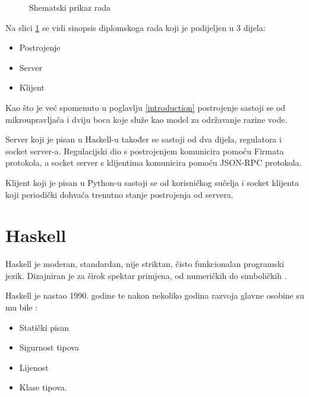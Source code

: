 \begin{figure}[H]
\caption{Shematski prikaz rada}
\label{fig:main_sheme}
\end{figure}

Na slici \ref{fig:main_sheme} se vidi sinopsis diplomskoga rada koji je podijeljen u 3 dijela:
\begin{itemize}
        \item Postrojenje
        \item Server
        \item Klijent
\end{itemize}

Kao što je već spomenuto u poglavlju \ref{introduction} postrojenje sastoji se
od mikroupravljača i dviju boca koje služe kao model za održavanje razine vode.

Server koji je pisan u Haskell-u također se sastoji od dva dijela, regulatora i
socket server-a. Regulacijski dio s postrojenjem komunicira pomoću Firmata
protokola, a socket server s klijentima komunicira pomoću JSON-RPC protokola.

Klijent koji je pisan u Python-u sastoji se od korisničkog sučelja i socket
klijenta koji periodički dohvaća trenutno stanje postrojenja od servera.

\section{Haskell}

Haskell je moderan, standardan, nije striktan, čisto funkcionalan programski
jezik. Dizajniran je za širok spektar primjena, od numeričkih do
simboličkih \cite{haskell_intro}.

Haskell je nastao 1990. godine te nakon nekoliko godina razvoja glavne osobine
su mu bile \cite{haskell_history}:

\begin{itemize}
\item Statički pisan
\item Sigurnost tipova
\item Lijenost
\item Klase tipova.
\end{itemize}

